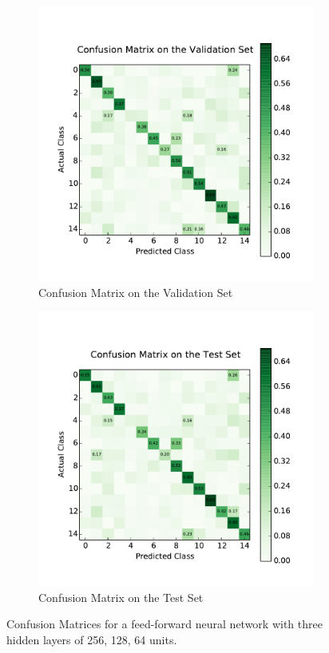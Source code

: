 \begin{figure}
	\centering
	\begin{subfigure}[b]{0.45\linewidth}
		\centering
		\includegraphics[width=\linewidth]{images/2/cm_valid.pdf}
		\caption{Confusion Matrix on the Validation Set}
	\end{subfigure}
	\hfill
	\begin{subfigure}[b]{0.45\linewidth}
		\centering
		\includegraphics[width=\linewidth]{images/2/cm_test.pdf}
		\caption{Confusion Matrix on the Test Set}
	\end{subfigure}
	\caption{Confusion Matrices for a feed-forward neural network with three hidden layers of 256, 128, 64 units.}
	\label{shrine2_mat}
\end{figure}
